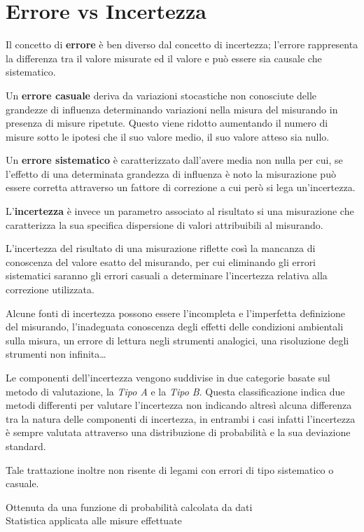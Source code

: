 \documentclass[a4paper, 15pt]{article}
\begin{document}
\section{Errore vs Incertezza}
\begin{adjustwidth}{2in}{}		
		Il concetto di \textbf{errore} è ben diverso dal concetto di incertezza; l'errore rappresenta la differenza tra il valore misurate ed il valore e può essere sia causale che sistematico. 
		
		Un \textbf{errore casuale} deriva da variazioni stocastiche non conosciute delle grandezze di influenza determinando variazioni nella misura del misurando in presenza di misure ripetute. Questo viene ridotto aumentando il numero di misure sotto le ipotesi che il suo valore medio, il suo valore atteso sia nullo. 
		
		Un \textbf{errore sistematico} è caratterizzato dall'avere media non nulla per cui, se l'effetto di una determinata grandezza di influenza è noto la misurazione può
		essere corretta attraverso un fattore di correzione a cui però si lega un'incertezza.\newline 
		
		L'\textbf{incertezza} è invece un parametro associato al risultato si una misurazione che caratterizza la sua specifica dispersione di valori attribuibili al misurando. 
		
		L'incertezza del risultato di una misurazione riflette così la mancanza di
		conoscenza del valore esatto del misurando, per cui eliminando gli errori sistematici saranno gli errori casuali a determinare l’incertezza
		relativa alla correzione utilizzata.
		
		Alcune fonti di incertezza possono essere l'incompleta e l'imperfetta definizione del misurando, l'inadeguata conoscenza degli effetti delle condizioni ambientali sulla misura, un errore di lettura negli strumenti analogici, una risoluzione degli strumenti non infinita\dots\newline
		
		Le componenti dell'incertezza vengono suddivise in due categorie basate sul metodo di valutazione, la \textit{Tipo A} e la \textit{Tipo B}. Questa classificazione indica due metodi differenti per valutare l’incertezza non
		indicando altresì alcuna differenza tra la natura delle componenti di incertezza, in entrambi i casi infatti l’incertezza è sempre valutata attraverso una distribuzione di
		probabilità e la sua deviazione standard. 
		
		Tale trattazione inoltre non risente di legami con errori di tipo sistematico o casuale.  
\newpage		
		\begin{tcolorbox}[colback=blue!5!white,colframe=blue!75!black,title=TIPO A]
				Ottenuta da una
			funzione di probabilità
			calcolata da dati \\
			Statistica applicata alle misure effettuate
		\end{tcolorbox}
	 	 

\end{adjustwidth}
\end{document}
